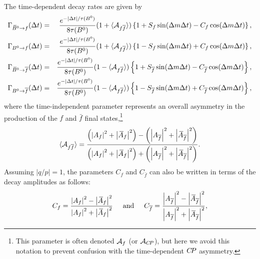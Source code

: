 The time-dependent decay rates are given by
\begin{eqnarray}
  \label{eq:cp_uta:non-CP-TD1}
  \Gamma_{\Bzb \to f} (\Delta t) & = &
  \frac{e^{-\left| \Delta t \right| / \tau(\Bz)}}{8\tau(\Bz)} 
  ( 1 + \Adirnoncp ) 
  \left\{ 
    1 + S_f \sin(\Delta m \Delta t) - C_f \cos(\Delta m \Delta t) 
  \right\},
  \\
  \label{eq:cp_uta:non-CP-TD2}
  \Gamma_{\Bz \to f} (\Delta t) & = &
  \frac{e^{-\left| \Delta t \right| / \tau(\Bz)}}{8\tau(\Bz)} 
  ( 1 + \Adirnoncp ) 
  \left\{ 
    1 - S_f \sin(\Delta m \Delta t) + C_f \cos(\Delta m \Delta t) 
  \right\},
  \\
  \label{eq:cp_uta:non-CP-TD3}
  \Gamma_{\Bzb \to \bar{f}} (\Delta t) & = &
  \frac{e^{-\left| \Delta t \right| / \tau(\Bz)}}{8\tau(\Bz)} 
  ( 1 - \Adirnoncp ) 
  \left\{ 
    1 + S_{\bar{f}} \sin(\Delta m \Delta t) - C_{\bar{f}} \cos(\Delta m \Delta t) 
  \right\},
  \\
  \label{eq:cp_uta:non-CP-TD4}
  \Gamma_{\Bz \to \bar{f}} (\Delta t) & = &
    \frac{e^{-\left| \Delta t \right| / \tau(\Bz)}}{8\tau(\Bz)} 
  ( 1 - \Adirnoncp ) 
  \left\{ 
    1 - S_{\bar{f}} \sin(\Delta m \Delta t) + C_{\bar{f}} \cos(\Delta m \Delta t) 
  \right\},
\end{eqnarray}
where the time-independent parameter \Adirnoncp
represents an overall asymmetry in the production of the 
$f$ and $\bar{f}$ final states,\footnote{
  This parameter is often denoted ${\cal A}_f$ (or ${\cal A}_{C\!P}$),
  but here we avoid this notation to prevent confusion with the
  time-dependent $C\!P$ asymmetry.
}
\begin{equation}
  \Adirnoncp = 
  \frac{
    \left( 
      \left| \Af \right|^2 + \left| \Abarf \right|^2
    \right) - 
    \left( 
      \left| \Afbar \right|^2 + \left| \Abarfbar \right|^2
    \right)
  }{
    \left( 
      \left| \Af \right|^2 + \left| \Abarf \right|^2
    \right) +
    \left( 
      \left| \Afbar \right|^2 + \left| \Abarfbar \right|^2
    \right)
  }.
\end{equation}
Assuming $|q/p| = 1$,
the parameters $C_f$ and $C_{\bar{f}}$
can also be written in terms of the decay amplitudes as follows:
\begin{equation}
  C_f = 
  \frac{
    \left| \Af \right|^2 - \left| \Abarf \right|^2 
  }{
    \left| \Af \right|^2 + \left| \Abarf \right|^2
  }
  \hspace{5mm}
  {\rm and}
  \hspace{5mm}
  C_{\bar{f}} = 
  \frac{
    \left| \Afbar \right|^2 - \left| \Abarfbar \right|^2
  }{
    \left| \Afbar \right|^2 + \left| \Abarfbar \right|^2
  },
\end{equation}
